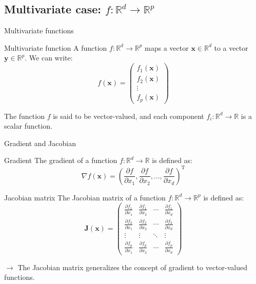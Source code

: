 \documentclass[aspectratio=1610]{beamer}
\begin{document}
\subsection{Multivariate case: $f:\mathbb{R}^d \to \mathbb{R}^p$}

\begin{frame}{Multivariate functions}

  \begin{block}{Multivariate function}
    A function $f:\mathbb{R}^d \to \mathbb{R}^p$ maps a vector $\mathbf{x} \in \mathbb{R}^d$ to a vector $\mathbf{y} \in \mathbb{R}^p$. We can write:
    $$f(\mathbf{x}) = \begin{pmatrix}
      f_1(\mathbf{x}) \\
      f_2(\mathbf{x}) \\
      \vdots \\
      f_p(\mathbf{x})
    \end{pmatrix}$$
  \end{block}

  The function $f$ is said to be vector-valued, and each component $f_i:\mathbb{R}^d \to \mathbb{R}$ is a scalar function.
\end{frame}


\begin{frame}{Gradient and Jacobian}

  \begin{block}{Gradient}
    The gradient of a function $f:\mathbb{R}^d \to \mathbb{R}$ is defined as:
    $$\nabla f(\mathbf{x}) = \left( \frac{\partial f}{\partial x_1}, \frac{\partial f}{\partial x_2}, \ldots, \frac{\partial f}{\partial x_d} \right)^\mathrm{T}$$
  \end{block}

  \begin{block}{Jacobian matrix}
    The Jacobian matrix of a function $f:\mathbb{R}^d \to \mathbb{R}^p$ is defined as:
    $$\mathbf{J}(\mathbf{x}) = \begin{pmatrix}
      \frac{\partial f_1}{\partial x_1} & \frac{\partial f_1}{\partial x_2} & \cdots & \frac{\partial f_1}{\partial x_d} \\
      \frac{\partial f_2}{\partial x_1} & \frac{\partial f_2}{\partial x_2} & \cdots & \frac{\partial f_2}{\partial x_d} \\
      \vdots & \vdots & \ddots & \vdots \\
      \frac{\partial f_p}{\partial x_1} & \frac{\partial f_p}{\partial x_2} & \cdots & \frac{\partial f_p}{\partial x_d}
    \end{pmatrix}$$
  \end{block}

  $\rightarrow$ The Jacobian matrix generalizes the concept of gradient to vector-valued functions.

\end{frame}
\end{document}
